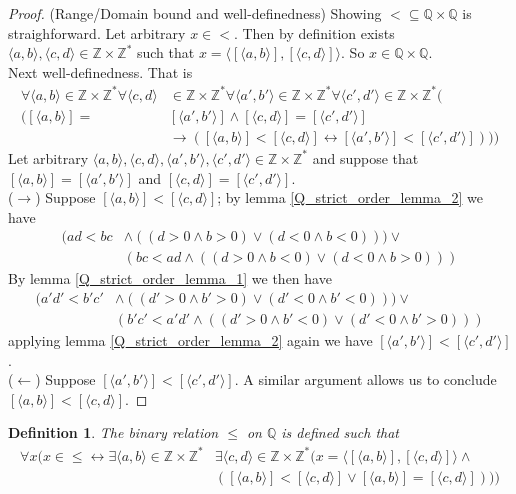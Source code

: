 \documentclass{report}
\newtheorem{definition}[theo]{Definition}
\begin{document}
\begin{proof}(Range/Domain bound and well-definedness)
Showing $<\subseteq\mathbb Q\times\mathbb Q$ is straighforward. Let arbitrary $x\in<$. Then by definition exists $\langle a,b\rangle,\langle c,d\rangle\in\mathbb Z\times\mathbb Z^*$ 
such that $x=\langle[\langle a,b\rangle],[\langle c,d\rangle]\rangle$. So $x\in\mathbb Q\times\mathbb Q$.\\
\indent Next well-definedness. That is
\begin{align*}
\forall\langle a,b\rangle\in\mathbb Z\times\mathbb Z^*\forall\langle c,d\rangle&\in\mathbb Z\times\mathbb Z^*
\forall\langle a',b'\rangle\in\mathbb Z\times\mathbb Z^*\forall\langle c',d'\rangle\in\mathbb Z\times\mathbb Z^*(\\
([\langle a,b\rangle]=&[\langle a',b'\rangle]\land[\langle c,d\rangle]=[\langle c',d'\rangle]\\
&\to([\langle a,b\rangle]<[\langle c,d\rangle]\leftrightarrow[\langle a',b'\rangle]<[\langle c',d'\rangle])))
\end{align*}
Let arbitrary $\langle a,b\rangle,\langle c,d\rangle,\langle a',b'\rangle,\langle c',d'\rangle\in\mathbb Z\times\mathbb Z^*$ and suppose that
$[\langle a,b\rangle]=[\langle a',b'\rangle]$ and $[\langle c,d\rangle]=[\langle c',d'\rangle]$.\\
\indent($\rightarrow$) Suppose $[\langle a,b\rangle]<[\langle c,d\rangle]$; by lemma \ref{Q_strict_order_lemma_2} we have
\begin{align*}
(ad<bc&\land((d>0\land b>0)\lor(d<0\land b<0)))\lor\\
&(bc<ad\land((d>0\land b<0)\lor(d<0\land b>0)))
\end{align*}
By lemma \ref{Q_strict_order_lemma_1} we then have
\begin{align*}
(a'd'<b'c'&\land((d'>0\land b'>0)\lor(d'<0\land b'<0)))\lor\\
&(b'c'<a'd'\land((d'>0\land b'<0)\lor(d'<0\land b'>0)))
\end{align*}
applying lemma \ref{Q_strict_order_lemma_2} again we have $[\langle a',b'\rangle]<[\langle c',d'\rangle]$.\\
\indent ($\leftarrow$) Suppose $[\langle a',b'\rangle]<[\langle c',d'\rangle]$. A similar argument allows us to conclude $[\langle a,b\rangle]<[\langle c,d\rangle]$.
\end{proof}
\begin{definition}
The binary relation $\leq$ on $\mathbb Q$ is defined such that
\begin{align*}
\forall x(x\in\leq\leftrightarrow\exists\langle a,b\rangle\in\mathbb Z\times\mathbb Z^*&
\exists\langle c,d\rangle\in\mathbb Z\times\mathbb Z^*(x=\langle[\langle a,b\rangle],[\langle c,d\rangle]\rangle\land\\
&([\langle a,b\rangle]<[\langle c,d\rangle]\lor[\langle a,b\rangle]=[\langle c,d\rangle])))
\end{align*}
\end{definition}
\end{document}
